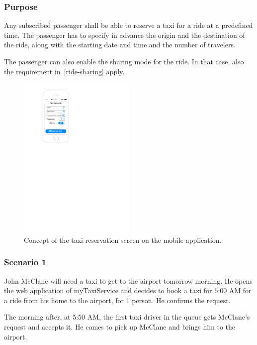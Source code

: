 \label{taxi-reservation}
\subsubsection{Purpose}

Any subscribed passenger shall be able to reserve a taxi for a ride at a predefined time. The passenger has to specify in advance the origin and the destination of the ride, along with the starting date and time and the number of travelers.

The passenger can also enable the sharing mode for the ride.
In that case, also the requirement in~\autoref{ride-sharing} apply.

\begin{figure}
	\begin{center}
	\includegraphics[width=0.5\textwidth]{mockup/TaxiReservation.pdf}
	\caption{Concept of the taxi reservation screen on the mobile application.}
	\label{fig:mockup-reservation}
	\end{center}
\end{figure}

\subsubsection{Scenario 1}
John McClane will need a taxi to get to the airport tomorrow morning. He opens the web application of myTaxiService and decides to book a taxi for 6:00 AM for a ride from his home to the airport, for 1 person. He confirms the request.

The morning after, at 5:50 AM, the first taxi driver in the queue gets McClane's request and accepts it. He comes to pick up McClane and brings him to the airport.

